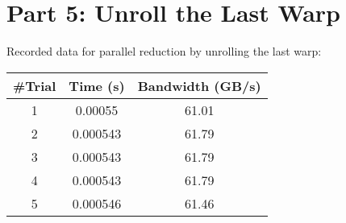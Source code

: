 \section{Part 5: Unroll the Last Warp}
\label{sec:part5}

Recorded data for parallel reduction by unrolling the last warp:

\begin{center}
	\begin{tabular}{||c c c||} 
		\hline
		\#Trial & Time (s) & Bandwidth (GB/s) \\ [0.5ex] 
		\hline\hline
		1 & 0.00055 & 61.01 \\ 
		\hline
		2 & 0.000543 & 61.79 \\
		\hline
		3 & 0.000543 & 61.79 \\
		\hline
		4 & 0.000543 & 61.79 \\
		\hline
		5 & 0.000546 & 61.46 \\
		\hline
	\end{tabular}
\end{center}